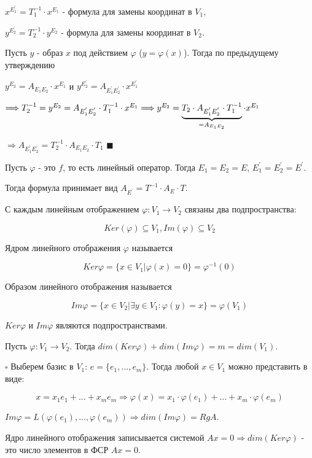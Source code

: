 \documentclass[../main.tex]{subfiles}
\begin{document}
$x^{E_1^{'}} = T_1^{-1}\cdot x^{E_1}$ - формула для замены координат в $V_1$,

$y^{E_2^{'}} = T_2^{-1}\cdot y^{E_2}$ - формула для замены координат в $V_2$.

Пусть $y$ - образ $x$ под действием $\varphi$ ($y = \varphi(x)$). Тогда по предыдущему утверждению

$y^{E_2} = A_{E_1E_2}\cdot x^{E_1}$ и $y^{E_2^{'}} = A_{E_1^{'}E_2^{'}}\cdot x^{E_1^{'}}$

$\Longrightarrow T_2^{-1} = y^{E_2} = A_{E_1^{'}E_2^{'}}\cdot T_1^{-1}\cdot x^{E_1} \Longrightarrow
y^{E_2} = \underbrace{ T_2\cdot A_{E_1^{'}E_2^{'}}\cdot T_1^{-1} }_{= A_{E_1E_2}}\cdot x^{E_1}$

$\Longrightarrow A_{E_1^{'}E_2^{'}} = T_2^{-1}\cdot A_{E_1E_2}\cdot T_1$ $\blacksquare$

\void{} Пусть $\varphi$ - это $f$, то есть линейный оператор. Тогда $E_1 = E_2 = E$, $E_1^{'} = E_2^{'} = E^{'}$.

Тогда формула принимает вид $A_{E^{'}} = T^{-1}\cdot A_E\cdot T$.

\void{} С каждым линейным отображением $\varphi: V_1\rightarrow V_2$ связаны два подпространства:

$$Ker(\varphi)\subseteq V_1, Im(\varphi)\subseteq V_2$$

\void{} Ядром линейного отображения $\varphi$ называется

$$Ker\varphi = \{x\in V_1\vert \varphi(x) = 0\} = \varphi^{-1}(0)$$

\void{} Образом линейного отображения называется

$$Im\varphi = \{ x\in V_2\vert \exists y\in V_1: \varphi(y) = x \} = \varphi(V_1)$$

\void{} $Ker\varphi$ и $Im\varphi$ являются подпространствами.

\void{} Пусть $\varphi: V_1\rightarrow V_2$. Тогда $dim(Ker\varphi) + dim(Im\varphi) = m = dim(V_1)$.

\void
$\square$ Выберем базис в $V_1$: $e = \{e_1,...,e_m\}$. Тогда любой $x\in V_1$ можно представить в виде:

$$x = x_1e_1 + ... + x_m e_m\Longrightarrow \varphi(x) = x_1\cdot\varphi(e_1) + ... + x_m\cdot\varphi(e_m)$$

$Im\varphi = L(\varphi(e_1),...,\varphi(e_m))\Longrightarrow dim(Im\varphi) = RgA$.

Ядро линейного отображения записывается системой $Ax = 0\Longrightarrow dim(Ker\varphi)$ - это число элементов в ФСР
$Ax = 0$.
\end{document}
